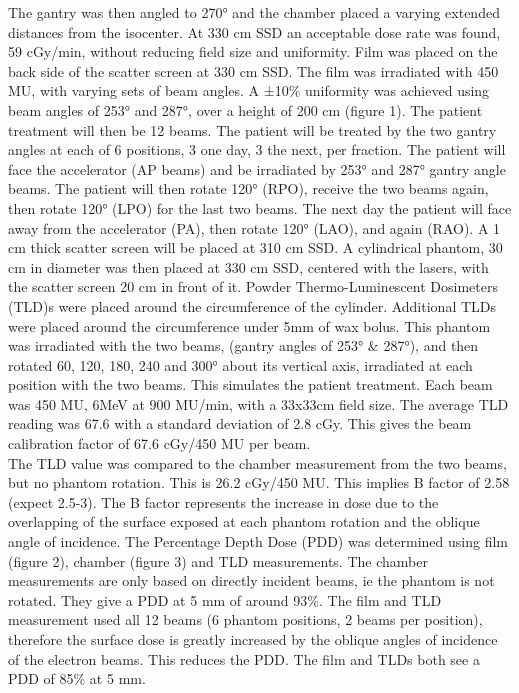 \documentclass[]{book}
\theoremstyle{definition}
\theoremstyle{definition}
\theoremstyle{definition}
\theoremstyle{remark}
\begin{document}
The gantry was then angled to 270° and the chamber placed a varying
extended distances from the isocenter. At 330 cm SSD an acceptable dose
rate was found, 59 cGy/min, without reducing field size and uniformity.
Film was placed on the back side of the scatter screen at 330 cm SSD.
The film was irradiated with 450 MU, with varying sets of beam angles. A
±10\% uniformity was achieved using beam angles of 253° and 287°, over a
height of 200 cm (figure 1). The patient treatment will then be 12
beams. The patient will be treated by the two gantry angles at each of 6
positions, 3 one day, 3 the next, per fraction. The patient will face
the accelerator (AP beams) and be irradiated by 253° and 287° gantry
angle beams. The patient will then rotate 120° (RPO), receive the two
beams again, then rotate 120° (LPO) for the last two beams. The next day
the patient will face away from the accelerator (PA), then rotate 120°
(LAO), and again (RAO). A 1 cm thick scatter screen will be placed at
310 cm SSD. A cylindrical phantom, 30 cm in diameter was then placed at
330 cm SSD, centered with the lasers, with the scatter screen 20 cm in
front of it. Powder Thermo-Luminescent Dosimeters (TLD)s were placed
around the circumference of the cylinder. Additional TLDs were placed
around the circumference under 5mm of wax bolus. This phantom was
irradiated with the two beams, (gantry angles of 253° \& 287°), and then
rotated 60, 120, 180, 240 and 300° about its vertical axis, irradiated
at each position with the two beams. This simulates the patient
treatment. Each beam was 450 MU, 6MeV at 900 MU/min, with a 33x33cm
field size. The average TLD reading was 67.6 with a standard deviation
of 2.8 cGy. This gives the beam calibration factor of 67.6 cGy/450 MU
per beam.\\
The TLD value was compared to the chamber measurement from the two
beams, but no phantom rotation. This is 26.2 cGy/450 MU. This implies B
factor of 2.58 (expect 2.5-3). The B factor represents the increase in
dose due to the overlapping of the surface exposed at each phantom
rotation and the oblique angle of incidence. The Percentage Depth Dose
(PDD) was determined using film (figure 2), chamber (figure 3) and TLD
measurements. The chamber measurements are only based on directly
incident beams, ie the phantom is not rotated. They give a PDD at 5 mm
of around 93\%. The film and TLD measurement used all 12 beams (6
phantom positions, 2 beams per position), therefore the surface dose is
greatly increased by the oblique angles of incidence of the electron
beams. This reduces the PDD. The film and TLDs both see a PDD of 85\% at
5 mm.
\end{document}
